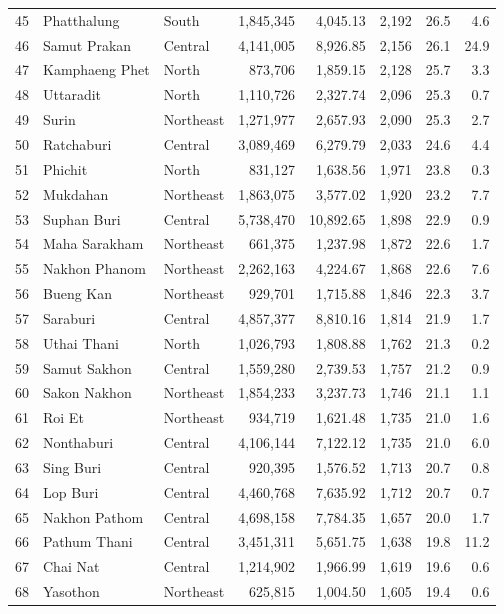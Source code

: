 \begin{longtable}{rllrrrrr}
45 & Phatthalung & South & 1,845,345 & 4,045.13 & 2,192 & 26.5 & 4.6 \\
46 & Samut Prakan & Central & 4,141,005 & 8,926.85 & 2,156 & 26.1 & 24.9 \\
47 & Kamphaeng Phet & North & 873,706 & 1,859.15 & 2,128 & 25.7 & 3.3 \\
48 & Uttaradit & North & 1,110,726 & 2,327.74 & 2,096 & 25.3 & 0.7 \\
49 & Surin & Northeast & 1,271,977 & 2,657.93 & 2,090 & 25.3 & 2.7 \\
50 & Ratchaburi & Central & 3,089,469 & 6,279.79 & 2,033 & 24.6 & 4.4 \\
51 & Phichit & North & 831,127 & 1,638.56 & 1,971 & 23.8 & 0.3 \\
52 & Mukdahan & Northeast & 1,863,075 & 3,577.02 & 1,920 & 23.2 & 7.7 \\
53 & Suphan Buri & Central & 5,738,470 & 10,892.65 & 1,898 & 22.9 & 0.9 \\
54 & Maha Sarakham & Northeast & 661,375 & 1,237.98 & 1,872 & 22.6 & 1.7 \\
55 & Nakhon Phanom & Northeast & 2,262,163 & 4,224.67 & 1,868 & 22.6 & 7.6 \\
56 & Bueng Kan & Northeast & 929,701 & 1,715.88 & 1,846 & 22.3 & 3.7 \\
57 & Saraburi & Central & 4,857,377 & 8,810.16 & 1,814 & 21.9 & 1.7 \\
58 & Uthai Thani & North & 1,026,793 & 1,808.88 & 1,762 & 21.3 & 0.2 \\
59 & Samut Sakhon & Central & 1,559,280 & 2,739.53 & 1,757 & 21.2 & 0.9 \\
60 & Sakon Nakhon & Northeast & 1,854,233 & 3,237.73 & 1,746 & 21.1 & 1.1 \\
61 & Roi Et & Northeast & 934,719 & 1,621.48 & 1,735 & 21.0 & 1.6 \\
62 & Nonthaburi & Central & 4,106,144 & 7,122.12 & 1,735 & 21.0 & 6.0 \\
63 & Sing Buri & Central & 920,395 & 1,576.52 & 1,713 & 20.7 & 0.8 \\
64 & Lop Buri & Central & 4,460,768 & 7,635.92 & 1,712 & 20.7 & 0.7 \\
65 & Nakhon Pathom & Central & 4,698,158 & 7,784.35 & 1,657 & 20.0 & 1.7 \\
66 & Pathum Thani & Central & 3,451,311 & 5,651.75 & 1,638 & 19.8 & 11.2 \\
67 & Chai Nat & Central & 1,214,902 & 1,966.99 & 1,619 & 19.6 & 0.6 \\
68 & Yasothon & Northeast & 625,815 & 1,004.50 & 1,605 & 19.4 & 0.6 \\

\end{longtable}
